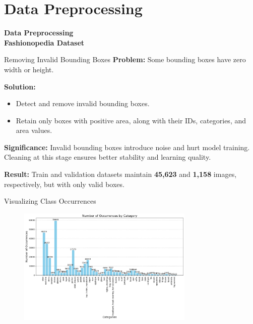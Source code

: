 \section{Data Preprocessing}
\begin{frame}{}
  \Huge
  \centering
  \textbf{Data Preprocessing} \\
  \normalsize
  \vspace{1em}
  \textbf{Fashionopedia Dataset}
  \normalsize
\end{frame}

\begin{frame}{Removing Invalid Bounding Boxes}
  \textbf{Problem:} Some bounding boxes have zero width or height.

  \textbf{Solution:}
  \begin{itemize}
      \item Detect and remove invalid bounding boxes.
      \item Retain only boxes with positive area, along with their IDs, categories, and area values.
  \end{itemize}

  \begin{block}{}
  \textbf{Significance: }Invalid bounding boxes introduce noise and hurt model training.
  Cleaning at this stage ensures better stability and learning quality.
  \end{block}

  \begin{block}{}
    \textbf{Result: }Train and validation datasets maintain \textbf{45,623} and \textbf{1,158} images, respectively, but with only valid boxes.
  \end{block}
  \end{frame}

\begin{frame}{Visualizing Class Occurrences}

\begin{figure}[H]
    \centering
    \includegraphics[width=0.75\textwidth]{../report_final/images/classes.png}
\end{figure}

\end{frame}

